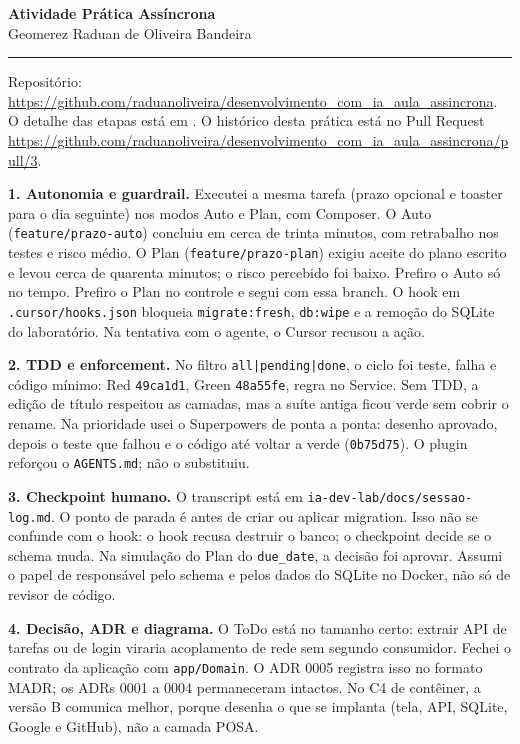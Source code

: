 \documentclass[12pt,a4paper]{article}
\begin{document}
\sloppy

\begin{center}
{\bfseries Atividade Prática Assíncrona}\\
Geomerez Raduan de Oliveira Bandeira
\end{center}

\vspace{0.12em}
\hrule
\vspace{0.32em}

\noindent Repositório: \url{https://github.com/raduanoliveira/desenvolvimento_com_ia_aula_assincrona}.
O detalhe das etapas está em .
O histórico desta prática está no Pull Request \url{https://github.com/raduanoliveira/desenvolvimento_com_ia_aula_assincrona/pull/3}.

\textbf{1. Autonomia e guardrail.} Executei a mesma tarefa (prazo opcional e toaster para o dia seguinte) nos modos Auto e Plan, com Composer. O Auto (\texttt{feature/prazo-auto}) concluiu em cerca de trinta minutos, com retrabalho nos testes e risco médio. O Plan (\texttt{feature/prazo-plan}) exigiu aceite do plano escrito e levou cerca de quarenta minutos; o risco percebido foi baixo. Prefiro o Auto só no tempo. Prefiro o Plan no controle e segui com essa branch. O hook em \texttt{.cursor/hooks.json} bloqueia \texttt{migrate:fresh}, \texttt{db:wipe} e a remoção do SQLite do laboratório. Na tentativa com o agente, o Cursor recusou a ação.

\textbf{2. TDD e enforcement.} No filtro \texttt{all|pending|done}, o ciclo foi teste, falha e código mínimo: Red \texttt{49ca1d1}, Green \texttt{48a55fe}, regra no Service. Sem TDD, a edição de título respeitou as camadas, mas a suíte antiga ficou verde sem cobrir o rename. Na prioridade usei o Superpowers de ponta a ponta: desenho aprovado, depois o teste que falhou e o código até voltar a verde (\texttt{0b75d75}). O plugin reforçou o \texttt{AGENTS.md}; não o substituiu.

\textbf{3. Checkpoint humano.} O transcript está em \texttt{ia-dev-lab/docs/sessao-log.md}. O ponto de parada é antes de criar ou aplicar migration. Isso não se confunde com o hook: o hook recusa destruir o banco; o checkpoint decide se o schema muda. Na simulação do Plan do \texttt{due\_date}, a decisão foi aprovar. Assumi o papel de responsável pelo schema e pelos dados do SQLite no Docker, não só de revisor de código.

\textbf{4. Decisão, ADR e diagrama.} O ToDo está no tamanho certo: extrair API de tarefas ou de login viraria acoplamento de rede sem segundo consumidor. Fechei o contrato da aplicação com \texttt{app/Domain}. O ADR 0005 registra isso no formato MADR; os ADRs 0001 a 0004 permaneceram intactos. No C4 de contêiner, a versão B comunica melhor, porque desenha o que se implanta (tela, API, SQLite, Google e GitHub), não a camada POSA.
\end{document}
